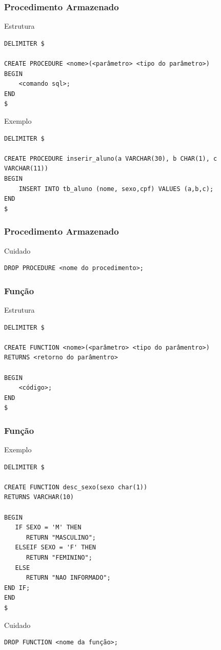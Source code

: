 \documentclass{beamer}
\begin{document}
\begin{frame}[fragile]
\frametitle{Procedimento Armazenado}

\begin{block}{Estrutura}
	\begin{lstlisting}
DELIMITER $

CREATE PROCEDURE <nome>(<parâmetro> <tipo do parâmetro>)
BEGIN
    <comando sql>;
END
$
	\end{lstlisting}
\end{block}\vfill

\begin{exampleblock}{Exemplo}
	\begin{lstlisting}
DELIMITER $

CREATE PROCEDURE inserir_aluno(a VARCHAR(30), b CHAR(1), c VARCHAR(11))
BEGIN
    INSERT INTO tb_aluno (nome, sexo,cpf) VALUES (a,b,c);
END
$	\end{lstlisting}
\end{exampleblock}
\end{frame}

\begin{frame}[fragile]
\frametitle{Procedimento Armazenado}

\begin{alertblock}{Cuidado}
	\begin{lstlisting}
DROP PROCEDURE <nome do procedimento>;
	\end{lstlisting}
\end{alertblock}
\end{frame}

\begin{frame}[fragile]
\frametitle{Função}

\begin{block}{Estrutura}
	\begin{lstlisting}
DELIMITER $

CREATE FUNCTION <nome>(<parâmetro> <tipo do parâmentro>) 
RETURNS <retorno do parâmentro>

BEGIN
    <código>;
END
$
	\end{lstlisting}
\end{block}
\end{frame}

\begin{frame}[fragile]
\frametitle{Função}

\begin{exampleblock}{Exemplo}
	\begin{lstlisting}
DELIMITER $
	
CREATE FUNCTION desc_sexo(sexo char(1)) 
RETURNS VARCHAR(10)

BEGIN
   IF SEXO = 'M' THEN
      RETURN "MASCULINO";
   ELSEIF SEXO = 'F' THEN
      RETURN "FEMININO"; 
   ELSE 
      RETURN "NAO INFORMADO";
END IF;
END
$
	\end{lstlisting}
\end{exampleblock}\vfill

\begin{alertblock}{Cuidado}
	\begin{lstlisting}
DROP FUNCTION <nome da função>;
	\end{lstlisting}
\end{alertblock}
\end{frame}
\end{document}
